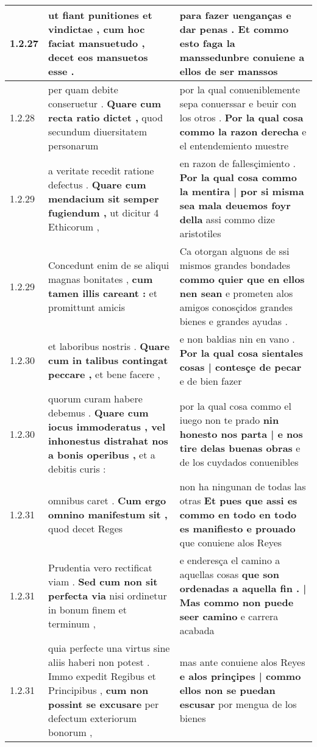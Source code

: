 \begin{tabular}{|p{1cm}|p{6.5cm}|p{6.5cm}|}
1.2.27 & ut fiant punitiones et vindictae , \textbf{ cum hoc faciat mansuetudo , } decet eos mansuetos esse . & para fazer uenganças e dar penas . \textbf{ Et commo esto faga la manssedunbre } conuiene a ellos de ser manssos \\\hline
1.2.28 & per quam debite conseruetur . \textbf{ Quare cum recta ratio dictet , } quod secundum diuersitatem personarum & por la qual conueniblemente sepa conuerssar e beuir con los otros . \textbf{ Por la qual cosa commo la razon derecha } e el entendemiento muestre \\\hline
1.2.29 & a veritate recedit ratione defectus . \textbf{ Quare cum mendacium sit semper fugiendum , } ut dicitur 4 Ethicorum , & en razon de fallesçimiento . \textbf{ Por la qual cosa commo la mentira | por si misma sea mala deuemos foyr della } assi commo dize aristotiles \\\hline
1.2.29 & Concedunt enim de se aliqui magnas bonitates , \textbf{ cum tamen illis careant : } et promittunt amicis & Ca otorgan alguons de ssi mismos grandes bondades \textbf{ commo quier que en ellos nen sean } e prometen alos amigos conosçidos grandes bienes e grandes ayudas . \\\hline
1.2.30 & et laboribus nostris . \textbf{ Quare cum in talibus contingat peccare , } et bene facere , & e non baldias nin en vano . \textbf{ Por la qual cosa sientales cosas | contesçe de pecar } e de bien fazer \\\hline
1.2.30 & quorum curam habere debemus . \textbf{ Quare cum iocus immoderatus , vel inhonestus distrahat nos a bonis operibus , } et a debitis curis : & por la qual cosa commo el iuego non te prado \textbf{ nin honesto nos parta | e nos tire delas buenas obras } e de los cuydados conuenibles \\\hline
1.2.31 & omnibus caret . \textbf{ Cum ergo omnino manifestum sit , } quod decet Reges & non ha ningunan de todas las otras \textbf{ Et pues que assi es commo en todo en todo es manifiesto e prouado } que conuiene alos Reyes \\\hline
1.2.31 & Prudentia vero rectificat viam . \textbf{ Sed cum non sit perfecta via } nisi ordinetur in bonum finem et terminum , & e enderesça el camino a aquellas cosas \textbf{ que son ordenadas a aquella fin . | Mas commo non puede seer camino } e carrera acabada \\\hline
1.2.31 & quia perfecte una virtus sine aliis haberi non potest . Immo expedit Regibus et Principibus , \textbf{ cum non possint se excusare } per defectum exteriorum bonorum , & mas ante conuiene alos Reyes \textbf{ e alos prinçipes | commo ellos non se puedan escusar } por mengua de los bienes \\\hline

\end{tabular}
